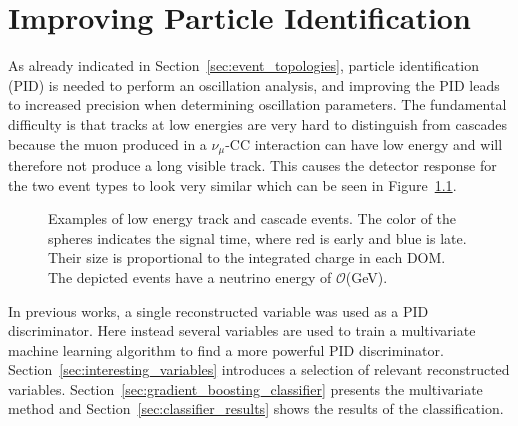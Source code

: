 \chapter{Improving Particle Identification} \label{chap:improving_pid}

As already indicated in Section~\ref{sec:event_topologies}, particle identification (PID) is needed to perform an oscillation analysis, and improving the PID leads to increased precision when determining oscillation parameters.
The fundamental difficulty is that tracks at low energies are very hard to distinguish from cascades because the muon produced in a $\nu_\mu$-CC interaction can have low energy and will therefore not produce a long visible track.
This causes the detector response for the two event types to look very similar which can be seen in Figure~\ref{fig:topologies_low_energy}.

\begin{figure}[h]
    \centering
        \hspace{0.75cm}
    \caption[Examples of low energy track and cascade events]
    {Examples of low energy track and cascade events. The color of the spheres indicates the signal time, where red is early and blue is late. Their size is proportional to the integrated charge in each DOM. The depicted events have a neutrino energy of $\mathcal{O}$(GeV).}
    \label{fig:topologies_low_energy}
\end{figure}

In previous works, a single reconstructed variable was used as a PID discriminator.
Here instead several variables are used to train a multivariate machine learning algorithm to find a more powerful PID discriminator.
Section~\ref{sec:interesting_variables} introduces a selection of relevant reconstructed variables.
Section~\ref{sec:gradient_boosting_classifier} presents the multivariate method and Section~\ref{sec:classifier_results} shows the results of the classification.


